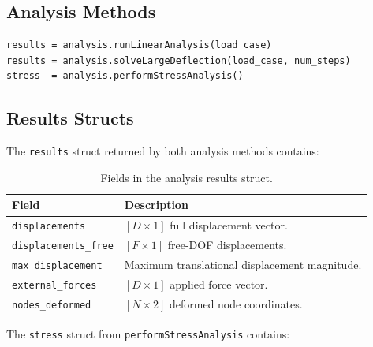 \subsection{Analysis Methods}

\begin{lstlisting}
results = analysis.runLinearAnalysis(load_case)
results = analysis.solveLargeDeflection(load_case, num_steps)
stress  = analysis.performStressAnalysis()
\end{lstlisting}

\subsection{Results Structs}

The \texttt{results} struct returned by both analysis methods contains:

\begin{table}[H]
\centering
\caption{Fields in the analysis results struct.}
\begin{tabularx}{\textwidth}{lX}
\toprule
\textbf{Field} & \textbf{Description} \\
\midrule
\texttt{displacements}      & $[D\times1]$ full displacement vector. \\
\texttt{displacements\_free} & $[F\times1]$ free-DOF displacements. \\
\texttt{max\_displacement}  & Maximum translational displacement magnitude. \\
\texttt{external\_forces}   & $[D\times1]$ applied force vector. \\
\texttt{nodes\_deformed}    & $[N\times2]$ deformed node coordinates. \\
\bottomrule
\end{tabularx}
\end{table}

The \texttt{stress} struct from \texttt{performStressAnalysis} contains:

